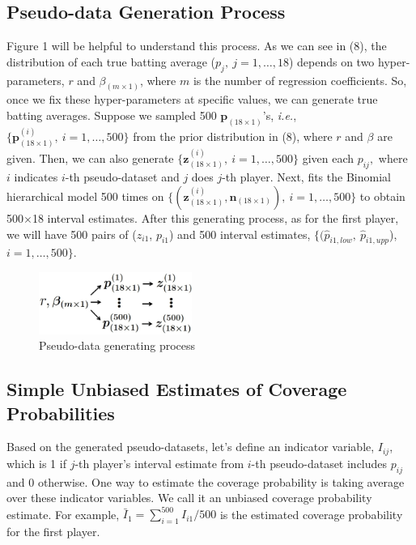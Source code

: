 \documentclass[article]{jss}
\begin{document}
\subsection{Pseudo-data Generation Process}
Figure 1 will be helpful to understand this process. As we can see in (8), the distribution of each true batting average ($p_{j},~j=1,\ldots, 18$) depends on two hyper-parameters, $r$ and $\beta_{(m\times1)}$, where $m$ is the number of regression coefficients. So, once we fix these hyper-parameters at specific values, we can generate true batting averages. Suppose we sampled 500 $\mathbf{p}_{(18\times1)}$'s, \emph{i.e.}, $\{\mathbf{p}^{(i)}_{(18\times1)},~i=1, \ldots, 500\}$ from the prior distribution in (8), where $r$ and $\beta$ are given. Then, we can also generate $\{\mathbf{z}^{(i)}_{(18\times1)},~i=1, \ldots, 500\}$ given each $p_{ij},$ where $i$ indicates $i$-th pseudo-dataset and $j$ does $j$-th player. Next,  fits the Binomial hierarchical model 500 times on $\{(\mathbf{z}^{(i)}_{(18\times1)}, \mathbf{n}_{(18 \times 1)}),~i=1, \ldots, 500\}$ to obtain 500$\times$18 interval estimates.  After this generating process, as for the first player, we will have 500 pairs of ($z_{i1}$, $p_{i1}$) and 500 interval estimates, $\{(\hat{p}_{i1, low}, ~\hat{p}_{i1, upp}$), $i=1, \ldots, 500\}$.
\begin{figure}[h]
\begin{center}
\includegraphics[width=5cm]{process.png}
\caption{Pseudo-data generating process}
\end{center}
\end{figure}

\subsection{Simple Unbiased Estimates of Coverage Probabilities}
Based on the generated pseudo-datasets, let's define an indicator variable, $I_{ij}$, which is 1 if $j$-th player's interval estimate from $i$-th pseudo-dataset includes $p_{ij}$ and 0 otherwise. One way to estimate the coverage probability is taking average over these indicator variables. We call it an unbiased coverage probability estimate. For example, $\bar{I}_{1}=\sum_{i=1}^{500}I_{i1}/500$ is the estimated coverage probability for the first player.
\end{document}
